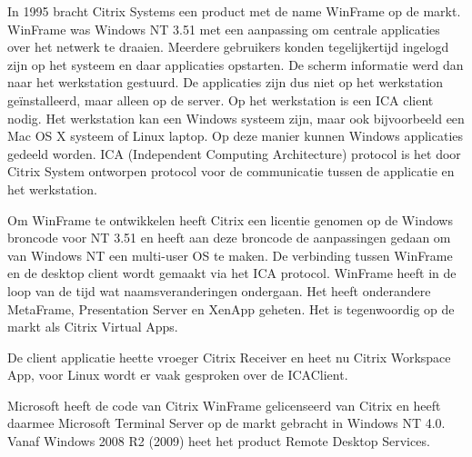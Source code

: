 In 1995 bracht Citrix Systems een product met de name WinFrame op de markt. WinFrame was Windows NT 3.51 met een aanpassing om centrale applicaties over het netwerk te draaien. Meerdere gebruikers konden tegelijkertijd ingelogd zijn op het systeem en daar applicaties opstarten. De scherm informatie werd dan naar het werkstation gestuurd. De applicaties zijn dus niet op het werkstation ge\"installeerd, maar alleen op de server. Op het werkstation is een ICA client nodig. Het werkstation kan een Windows systeem zijn, maar ook bijvoorbeeld een Mac OS X systeem of Linux laptop. Op deze manier kunnen Windows applicaties gedeeld worden. ICA (Independent Computing Architecture) protocol is het door Citrix System ontworpen protocol voor de communicatie tussen de applicatie en het werkstation.

Om WinFrame te ontwikkelen heeft Citrix een licentie genomen op de Windows broncode voor NT 3.51 en heeft aan deze broncode de aanpassingen gedaan om van Windows NT een multi-user OS te maken. De verbinding tussen WinFrame en de desktop client wordt gemaakt via het ICA protocol. WinFrame heeft in de loop van de tijd wat naamsveranderingen ondergaan. Het heeft onderandere MetaFrame, Presentation Server en XenApp geheten. Het is tegenwoordig op de markt als Citrix Virtual Apps.

De client applicatie heette vroeger Citrix Receiver en heet nu Citrix Workspace App, voor Linux wordt er vaak gesproken over de ICAClient.

Microsoft heeft de code van Citrix WinFrame gelicenseerd van Citrix en heeft daarmee Microsoft Terminal Server op de markt gebracht in Windows NT 4.0. Vanaf Windows 2008 R2 (2009) heet het product Remote Desktop Services.
